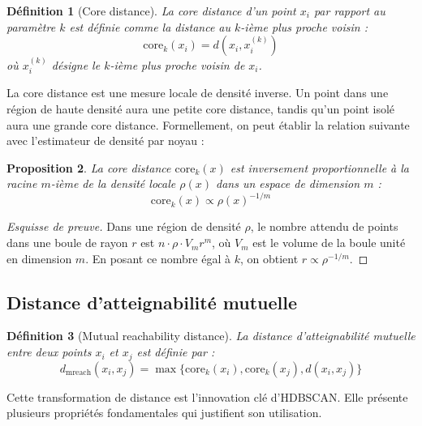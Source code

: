\documentclass[11pt,a4paper]{article}
\newtheorem{definition}{Définition}[section]
\newtheorem{proposition}[definition]{Proposition}
\begin{document}
\begin{definition}[Core distance]
La \textit{core distance} d'un point $x_i$ par rapport au paramètre $k$ est définie comme la distance au $k$-ième plus proche voisin :
\begin{equation}
\boxed{\text{core}_k(x_i) = d(x_i, x^{(k)}_i)}
\end{equation}
où $x^{(k)}_i$ désigne le $k$-ième plus proche voisin de $x_i$.
\end{definition}

La core distance est une mesure locale de densité inverse. Un point dans une région de haute densité aura une petite core distance, tandis qu'un point isolé aura une grande core distance. Formellement, on peut établir la relation suivante avec l'estimateur de densité par noyau :

\begin{proposition}
La core distance $\text{core}_k(x)$ est inversement proportionnelle à la racine $m$-ième de la densité locale $\rho(x)$ dans un espace de dimension $m$ :
\begin{equation}
\text{core}_k(x) \propto \rho(x)^{-1/m}
\end{equation}
\end{proposition}

\begin{proof}[Esquisse de preuve]
Dans une région de densité $\rho$, le nombre attendu de points dans une boule de rayon $r$ est $n \cdot \rho \cdot V_m r^m$, où $V_m$ est le volume de la boule unité en dimension $m$. En posant ce nombre égal à $k$, on obtient $r \propto \rho^{-1/m}$.
\end{proof}

\subsection{Distance d'atteignabilité mutuelle}

\begin{definition}[Mutual reachability distance]
La \textit{distance d'atteignabilité mutuelle} entre deux points $x_i$ et $x_j$ est définie par :
\begin{equation}
\boxed{d_{\text{mreach}}(x_i, x_j) = \max\bigl\{\text{core}_k(x_i), \text{core}_k(x_j), d(x_i, x_j)\bigr\}}
\end{equation}
\end{definition}

Cette transformation de distance est l'innovation clé d'HDBSCAN. Elle présente plusieurs propriétés fondamentales qui justifient son utilisation.
\end{document}
